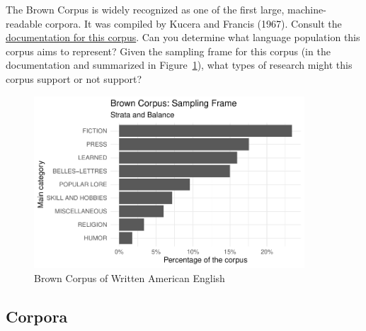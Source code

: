 \documentclass[
  letterpaper,
]{latex/krantz}
\begin{document}
\begin{tcolorbox}[enhanced jigsaw, opacitybacktitle=0.6, breakable, colframe=quarto-callout-important-color-frame, arc=.35mm, left=2mm, leftrule=.75mm, title=\textcolor{quarto-callout-important-color}{\faExclamation}\hspace{0.5em}{Consider}, opacityback=0, colback=white, toptitle=1mm, rightrule=.15mm, titlerule=0mm, bottomtitle=1mm, bottomrule=.15mm, coltitle=black, colbacktitle=quarto-callout-important-color!10!white, toprule=.15mm]
The Brown Corpus is widely recognized as one of the first large,
machine-readable corpora. It was compiled by Kucera and Francis (1967).
Consult the
\href{http://korpus.uib.no/icame/brown/bcm.html}{documentation for this
corpus}. Can you determine what language population this corpus aims to
represent? Given the sampling frame for this corpus (in the
documentation and summarized in Figure~\ref{fig-brown-distribution}),
what types of research might this corpus support or not support?
\end{tcolorbox}

\begin{figure}

{\centering \includegraphics[width=0.9\textwidth,height=\textheight]{./understanding-data_files/figure-pdf/fig-brown-distribution-1.pdf}

}

\caption{\label{fig-brown-distribution}Brown Corpus of Written American
English}

\end{figure}

\hypertarget{corpora}{%
\subsection{Corpora}\label{corpora}}
\end{document}
